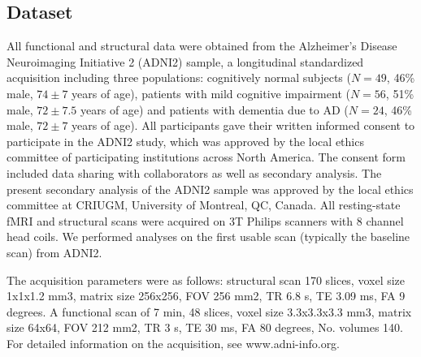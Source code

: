 \documentclass[authoryear]{elsarticle}
\begin{document}
\subsection*{Dataset}
All functional and structural data were obtained from the Alzheimer's Disease Neuroimaging Initiative 2 (ADNI2) sample, a longitudinal standardized acquisition including three populations: cognitively normal subjects ($N=49$, 46\% male, $74\pm7$ years of age), patients with mild cognitive impairment ($N=56$, 51\% male, $72\pm7.5$ years of age) and patients with dementia due to AD ($N=24$, 46\% male, $72\pm7$ years of age). All participants gave their written informed consent to participate in the ADNI2 study, which was approved by the local ethics committee of participating institutions across North America. The consent form included data sharing with collaborators as well as secondary analysis. The present secondary analysis of the ADNI2 sample was approved by the local ethics committee at CRIUGM, University of Montreal, QC, Canada. All resting-state fMRI and structural scans were acquired on 3T Philips scanners with 8 channel head coils. We performed analyses on the first usable scan (typically the baseline scan) from ADNI2.

The acquisition parameters were as follows: structural scan 170 slices, voxel size 1x1x1.2 mm3, matrix size 256x256, FOV 256 mm2, TR 6.8 s, TE 3.09 ms, FA 9 degrees. A functional scan of 7 min, 48 slices,  voxel size 3.3x3.3x3.3 mm3, matrix size 64x64, FOV 212 mm2, TR 3 s, TE 30 ms, FA 80 degrees, No. volumes 140. For detailed information on the acquisition, see www.adni-info.org.
\end{document}
